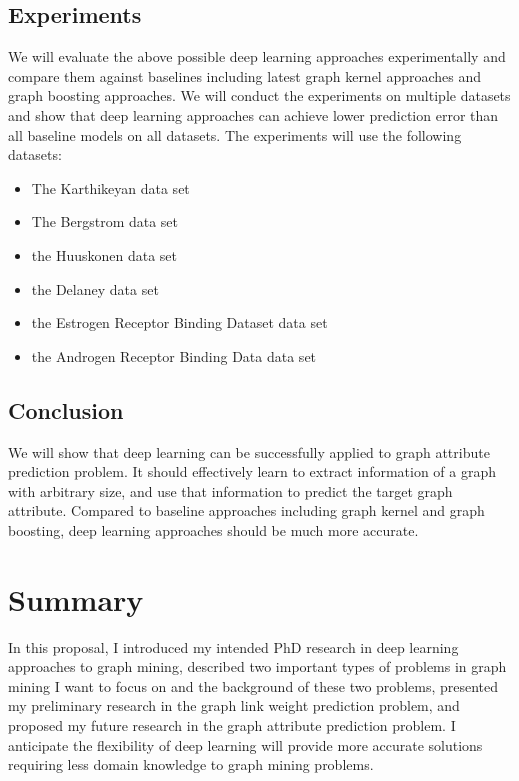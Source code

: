 \documentclass{article}
\begin{document}
\subsection{Experiments}
We will evaluate the above possible deep learning approaches
experimentally and compare them against baselines including latest graph kernel approaches and graph boosting approaches.
We will conduct the experiments on multiple datasets and show
that deep learning approaches can achieve lower prediction error
than all baseline models on all datasets.
The experiments will use the following datasets:
\begin{itemize}
	\item The Karthikeyan data set \cite{karthikeyan2005general}
	\item The Bergstrom data set \cite{bergstrom2003molecular}
	\item the Huuskonen data set \cite{huuskonen2000estimation}
	\item the Delaney data set \cite{delaney2004esol}
	\item the Estrogen Receptor Binding Dataset data set \cite{tong2002development}
	\item the Androgen Receptor Binding Data data set \cite{blair2000estrogen}
\end{itemize}

\subsection{Conclusion}
We will show that deep learning can be successfully applied to graph attribute prediction problem.
It should effectively learn to extract information of a graph with arbitrary size,
and use that information to predict the target graph attribute.
Compared to baseline approaches including graph kernel and graph boosting,
deep learning approaches should be much more accurate.

\section{Summary}
In this proposal, I introduced my intended PhD research in
deep learning approaches to graph mining,
described two important types of problems in graph mining
I want to focus on and the background of these two problems,
presented my preliminary research in the graph link weight prediction problem,
and proposed my future research in the graph attribute prediction problem.
I anticipate the flexibility of deep learning will provide more accurate solutions requiring less domain knowledge to graph mining problems.



\end{document}
